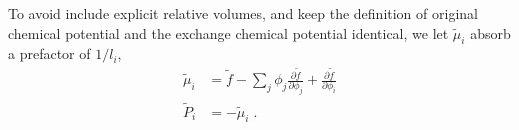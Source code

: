 \documentclass[reprint,onecolumn,groupedaddress,amsmath,amssymb]{revtex4-2}
\begin{document}
To avoid include explicit relative volumes, and keep the definition of original chemical potential and the exchange chemical potential identical, we let $\tilde{\mu}_i$ absorb a prefactor of $1/l_i$, 
\begin{subequations}
    \begin{align}
        \tilde{\mu}_i &=  \tilde{f} - \sum_j \phi_j \frac{\partial \tilde{f}}{\partial \phi_j} + \frac{\partial \tilde{f}}{\partial \phi_i} \\
        \tilde{P}_i &= - \tilde{\mu}_i \;.
    \end{align}
\end{subequations}  
\end{document}
